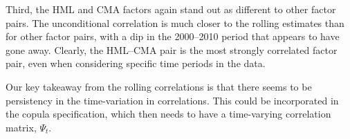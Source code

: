 Third, the HML and CMA factors again stand out as different to other factor pairs. The unconditional correlation is much closer to the rolling estimates than for other factor pairs, with a dip in the 2000--2010 period that appears to have gone away. Clearly, the HML--CMA pair is the most strongly correlated factor pair, even when considering specific time periods in the data.

Our key takeaway from the rolling correlations is that there seems to be persistency in the time-variation in correlations. This could be incorporated in the copula specification, which then needs to have a time-varying correlation matrix, $\Psi_t$.




\label{sub:threshold_and_rolling_correlations_of_residuals}

